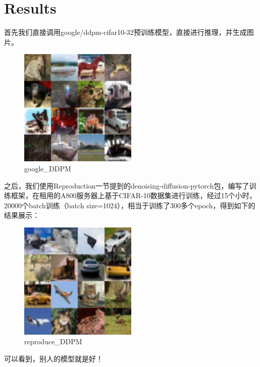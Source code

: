 \documentclass{ctexart}
\begin{document}
\section{Results}

首先我们直接调用google/ddpm-cifar10-32预训练模型，直接进行推理，并生成图片。
\begin{figure}[H]
     \centering
     \includegraphics[width=0.5\textwidth]{ddpm_cifar10_grid1.png}
     \caption{google\_DDPM}
     \label{fig:google_ddpm}  
\end{figure}


之后，我们使用Reproduction一节提到的denoising-diffusion-pytorch包，编写了训练框架，在租用的A800服务器上基于CIFAR-10数据集进行训练，经过15个小时，20000个batch训练（batch size=1024），相当于训练了300多个epoch，得到如下的结果展示：
\begin{figure}[H]
     \centering
     \includegraphics[width=0.5\textwidth]{ddpm_cifar10_grid.png}
     \caption{reproduce\_DDPM}
     \label{fig:reproduce_ddpm}  %
\end{figure}


可以看到，别人的模型就是好！
\end{document}

